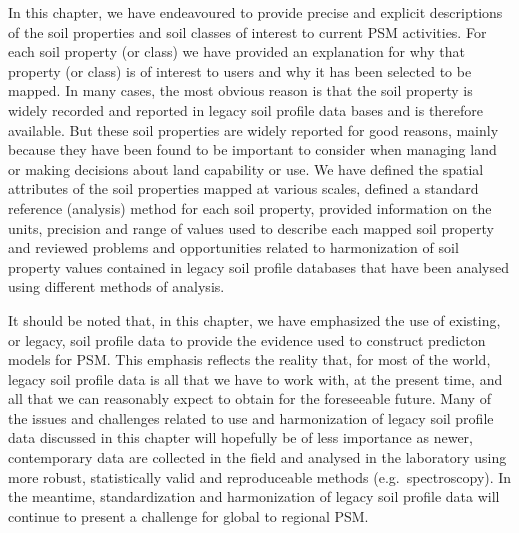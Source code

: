 \documentclass[11pt]{krantz}
\theoremstyle{definition}
\theoremstyle{definition}
\theoremstyle{definition}
\theoremstyle{remark}
\begin{document}
In this chapter, we have endeavoured to provide precise and explicit
descriptions of the soil properties and soil classes of interest to
current PSM activities. For each soil property (or class) we have
provided an explanation for why that property (or class) is of interest
to users and why it has been selected to be mapped. In many cases, the
most obvious reason is that the soil property is widely recorded and
reported in legacy soil profile data bases and is therefore available.
But these soil properties are widely reported for good reasons, mainly
because they have been found to be important to consider when managing
land or making decisions about land capability or use. We have defined
the spatial attributes of the soil properties mapped at various scales,
defined a standard reference (analysis) method for each soil property,
provided information on the units, precision and range of values used to
describe each mapped soil property and reviewed problems and
opportunities related to harmonization of soil property values contained
in legacy soil profile databases that have been analysed using different
methods of analysis.

It should be noted that, in this chapter, we have emphasized the use of
existing, or legacy, soil profile data to provide the evidence used to
construct predicton models for PSM. This emphasis reflects the reality
that, for most of the world, legacy soil profile data is all that we
have to work with, at the present time, and all that we can reasonably
expect to obtain for the foreseeable future. Many of the issues and
challenges related to use and harmonization of legacy soil profile data
discussed in this chapter will hopefully be of less importance as newer,
contemporary data are collected in the field and analysed in the
laboratory using more robust, statistically valid and reproduceable
methods (e.g.~spectroscopy). In the meantime, standardization and
harmonization of legacy soil profile data will continue to present a
challenge for global to regional PSM.
\end{document}
